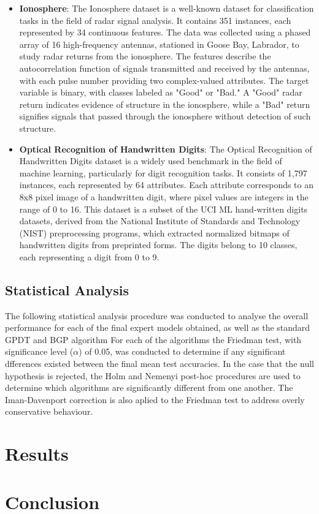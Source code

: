 \documentclass[conference]{IEEEtran}
\begin{document}
\begin{itemize}
        \item \textbf{Ionosphere}: The Ionosphere dataset is a well-known dataset for classification tasks in the field of 
        radar signal analysis. It contains 351 instances, each represented by 34 continuous features. The data was collected 
        using a phased array of 16 high-frequency antennas, stationed in Goose Bay, Labrador, to study radar returns from the 
        ionosphere. The features describe the autocorrelation function of signals transmitted and received by the antennas, 
        with each pulse number providing two complex-valued attributes. The target variable is binary, with classes labeled as 
        "Good" or "Bad." A "Good" radar return indicates evidence of structure in the ionosphere, while a "Bad" return signifies 
        signals that passed through the ionosphere without detection of such structure.
        
        \item \textbf{Optical Recognition of Handwritten Digits}: The Optical Recognition of Handwritten Digits dataset is a 
        widely used benchmark in the field of machine learning, particularly for digit recognition tasks. It consists of 1,797 
        instances, each represented by 64 attributes. Each attribute corresponds to an 8x8 pixel image of a handwritten digit, 
        where pixel values are integers in the range of 0 to 16. This dataset is a subset of the UCI ML hand-written digits datasets, 
        derived from the National Institute of Standards and Technology (NIST) preprocessing programs, which extracted normalized 
        bitmaps of handwritten digits from preprinted forms. The digits belong to 10 classes, each representing a digit from 0 to 9.
    \end{itemize}


    \subsection{Statistical Analysis}

        The following statistical analysis procedure was conducted to analyse the overall performance for each of the final expert models
        obtained, as well as the standard GPDT and BGP algorithm For each of the algorithms the Friedman test, with significance level ($\alpha$) of 0.05,
        was conducted to determine if any significant dfferences existed between the final mean test accuracies. In the case that the null
        hypothesis is rejected, the Holm and Nemenyi post-hoc procedures are used to determine which algorithms are significantly different from
        one another. The Iman-Davenport correction is also aplied to the Friedman test to address overly conservative behaviour.

\section{Results}


\section{Conclusion}




\end{document}
